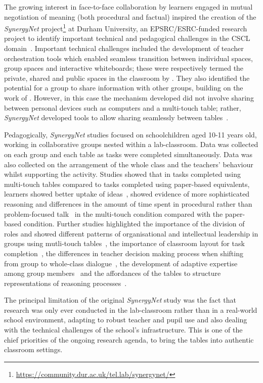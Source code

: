 \documentclass[twocolumn]{svjour3}          %
\begin{document}
The growing interest in face-to-face collaboration by learners engaged in mutual negotiation of meaning (both procedural and factual) inspired the creation of the {\emph{SynergyNet}} project\footnote{\url{https://community.dur.ac.uk/tel.lab/synergynet/}} at Durham University, an EPSRC/ESRC-funded research project to identify important technical and pedagogical challenges in the CSCL domain~\citep{higgins-et-al:2012}.
Important technical challenges included the development of teacher orchestration tools which enabled seamless transition between individual spaces, group spaces and interactive whiteboards; these were respectively termed the private, shared and public spaces in the classroom by \citet{dillenbourg:2011}.
They also identified the potential for a group to share information with other groups, building on the work of \citet{everitt:2006}.
However, in this case the mechanism developed did not involve sharing between personal devices such as computers and a multi-touch table; rather, {\emph{SynergyNet}} developed tools to allow sharing seamlessly between tables~\citep{hatch:2011b}.

Pedagogically, {\emph{SynergyNet}} studies focused on schoolchildren aged 10-11 years old, working in collaborative groups nested within a lab-classroom.
Data was collected on each group and each table as tasks were completed simultaneously.
Data was also collected on the arrangement of the whole class and the teachers’ behaviour whilst supporting the activity.
Studies showed that in tasks completed using multi-touch tables compared to tasks completed using paper-based equivalents, learners showed better uptake of ideas~\citep{mercier:2015}, showed evidence of more sophisticated reasoning  and differences in the amount of time spent in procedural rather than problem-focused talk~\citep{higgins-et-al:2012} in the multi-touch condition compared with the paper-based condition.
Further studies highlighted the importance of the division of roles and showed different patterns of organisational and intellectual leadership in groups using mutli-touch tables~\citep{mercier2014d}, the importance of classroom layout for task completion~\citep{mercier:2014c}, the differences in teacher decision making process when shifting from group to whole-class dialogue~\citep{Joyce-Gibbons:2016}, the development of adaptive expertise among group members~\citep{mercier:2013} and the affordances of the tables to structure representations of reasoning processes~\citep{mercier:2014b}.

The principal limitation of the original {\emph{SynergyNet}} study was the fact that research was only ever conducted in the lab-classroom rather than in a real-world school environment, adapting to robust teacher and pupil use and also dealing with the technical challenges of the school's infrastructure.
This is one of the chief priorities of the ongoing research agenda, to bring the tables into authentic classroom settings.
\end{document}
